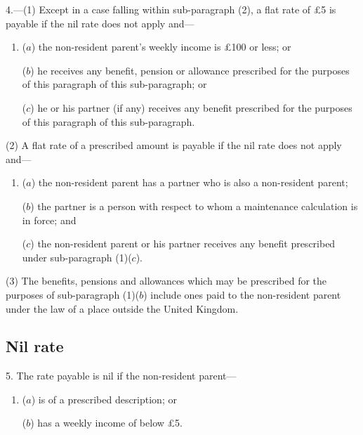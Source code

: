 \documentclass[12pt,a4paper]{article}
\begin{document}
{4.---(1) Except in a case falling within sub-paragraph (2), a flat rate of £5 is payable if the nil rate does not apply and---
\begin{enumerate}\item[]
($a$) the non-resident parent’s  weekly income is £100 or less; or

($b$) he receives any benefit, pension or allowance prescribed for the purposes of this paragraph of this sub-paragraph; or

($c$) he or his partner (if any) receives any benefit prescribed for the purposes of this paragraph of this sub-paragraph.
\end{enumerate}

(2)
A flat rate of a prescribed amount is payable if the nil rate does not apply and---
\begin{enumerate}\item[]
($a$) the non-resident parent has a partner who is also a non-resident parent;

($b$) the partner is a person with respect to whom a maintenance calculation is in force; and

($c$) the non-resident parent or his partner receives any benefit prescribed under sub-paragraph (1)($c$).
\end{enumerate}

(3)
The benefits, pensions and allowances which may be prescribed for the purposes of sub-paragraph (1)($b$) include ones paid to the non-resident parent under the law of a place outside the United Kingdom.


\subsection*{Nil rate}

5. The rate payable is nil if the non-resident parent---
\begin{enumerate}\item[]
($a$) is of a prescribed description; or

($b$) has a   weekly income of below £5.
\end{enumerate}

}
\end{document}
